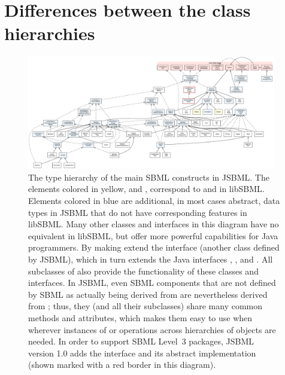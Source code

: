 
\section{Differences between the class hierarchies}
\label{sec:extended-type-hierarchy}

\begin{figure}
  \centering
  \includegraphics[width=0.97\textwidth]{../common/img/FullTypeHierarchy.pdf}
  \caption[The type hierarchy of the main SBML constructs in JSBML]{The
    type hierarchy of the main SBML constructs in JSBML. The elements
    colored in yellow,  and , correspond to
     and  in libSBML. Elements
    colored in blue are additional, in most cases abstract, data types in
    JSBML that do not have corresponding features in libSBML. Many other
    classes and interfaces in this diagram have no equivalent in libSBML,
    but offer more powerful capabilities for Java programmers. By making
    \SBase extend the interface \TreeNodeWithChangeSupport (another class
    defined by JSBML), which in turn extends the Java interfaces
    , , and \TreeNode. All subclasses
    of  also provide the functionality of these classes and
    interfaces. In JSBML, even SBML components that are not defined by
    SBML as actually being derived from  are nevertheless
    derived from \TreeNodeWithChangeSupport; thus, they (and all their
    subclasses) share many common methods and attributes, which makes them
    easy to use when wherever instances of \TreeNode or operations across
    hierarchies of objects are needed. In order to support SBML Level~3
    packages, JSBML version 1.0 adds the interface \SBasePlugin and its
    abstract implementation \AbstractSBasePlugin (shown marked
    with a red border in this diagram).} 
  \label{fig:TypeHierarchy}
\end{figure}

